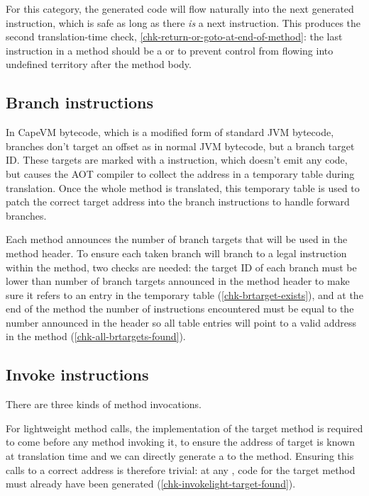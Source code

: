 For this category, the generated code will flow naturally into the next generated instruction, which is safe as long as there \emph{is} a next instruction. This produces the second translation-time check, \ref{chk-return-or-goto-at-end-of-method}: the last instruction in a method should be a  or  to prevent control from flowing into undefined territory after the method body.

\subsection{Branch instructions}
In CapeVM bytecode, which is a modified form of standard JVM bytecode, branches don't target an offset as in normal JVM bytecode, but a branch target ID. These targets are marked with a  instruction, which doesn't emit any code, but causes the AOT compiler to collect the address in a temporary table during translation. Once the whole method is translated, this temporary table is used to patch the correct target address into the branch instructions to handle forward branches.

Each method announces the number of branch targets that will be used in the method header. To ensure each taken branch will branch to a legal instruction within the method, two checks are needed: the target ID of each branch must be lower than number of branch targets announced in the method header to make sure it refers to an entry in the temporary table (\ref{chk-brtarget-exists}), and at the end of the method the number of  instructions encountered must be equal to the number announced in the header so all table entries will point to a valid address in the method (\ref{chk-all-brtargets-found}).

\subsection{Invoke instructions}
There are three kinds of method invocations.

For lightweight method calls, the implementation of the target method is required to come before any method invoking it, to ensure the address of target is known at translation time and we can directly generate a  to the method. Ensuring this calls to a correct address is therefore trivial: at any , code for the target method must already have been generated (\ref{chk-invokelight-target-found}).


